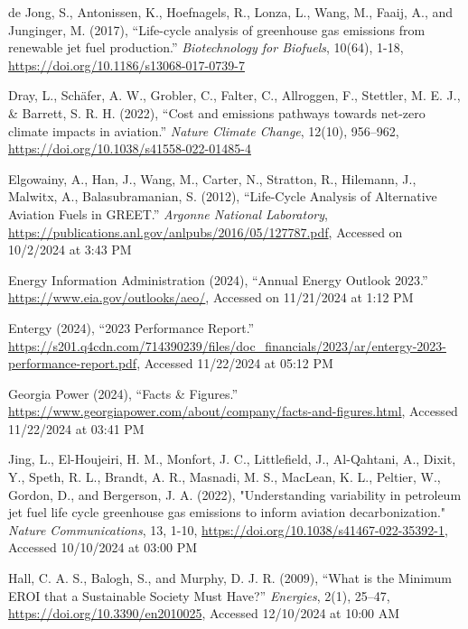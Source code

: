 \documentclass[12pt]{article}
\begin{document}
\begin{description}
    \item de Jong, S., Antonissen, K., Hoefnagels, R., Lonza, L., Wang, M., Faaij, A., and Junginger, M. (2017), “Life-cycle analysis of greenhouse gas emissions from renewable jet fuel production.” \textit{Biotechnology for Biofuels}, 10(64), 1-18, \url{https://doi.org/10.1186/s13068-017-0739-7}
    
    \item Dray, L., Schäfer, A. W., Grobler, C., Falter, C., Allroggen, F., Stettler, M. E. J., & Barrett, S. R. H. (2022), “Cost and emissions pathways towards net-zero climate impacts in aviation.” \textit{Nature Climate Change}, 12(10), 956–962, \url{https://doi.org/10.1038/s41558-022-01485-4}
    
    \item Elgowainy, A., Han, J., Wang, M., Carter, N., Stratton, R., Hilemann, J., Malwitx, A., Balasubramanian, S. (2012), “Life-Cycle Analysis of Alternative Aviation Fuels in GREET.” \textit{Argonne National Laboratory}, \url{https://publications.anl.gov/anlpubs/2016/05/127787.pdf}, Accessed on 10/2/2024 at 3:43 PM
    
    \item Energy Information Administration (2024), “Annual Energy Outlook 2023.” \url{https://www.eia.gov/outlooks/aeo/}, Accessed on 11/21/2024 at 1:12 PM
    
    \item Entergy (2024), “2023 Performance Report.” \url{https://s201.q4cdn.com/714390239/files/doc_financials/2023/ar/entergy-2023-performance-report.pdf}, Accessed 11/22/2024 at 05:12 PM
    
    \item Georgia Power (2024), “Facts & Figures.” \url{https://www.georgiapower.com/about/company/facts-and-figures.html}, Accessed 11/22/2024 at 03:41 PM
    
    \item Jing, L., El-Houjeiri, H. M., Monfort, J. C., Littlefield, J., Al-Qahtani, A., Dixit, Y., Speth, R. L., Brandt, A. R., Masnadi, M. S., MacLean, K. L., Peltier, W., Gordon, D., and Bergerson, J. A. (2022), "Understanding variability in petroleum jet fuel life cycle greenhouse gas emissions to inform aviation decarbonization." \textit{Nature Communications}, 13, 1-10, \url{https://doi.org/10.1038/s41467-022-35392-1}, Accessed 10/10/2024 at 03:00 PM
    
    \item Hall, C. A. S., Balogh, S., and Murphy, D. J. R. (2009), “What is the Minimum EROI that a Sustainable Society Must Have?” \textit{Energies}, 2(1), 25–47, \url{https://doi.org/10.3390/en2010025}, Accessed 12/10/2024 at 10:00 AM


\end{description}
\end{document}
